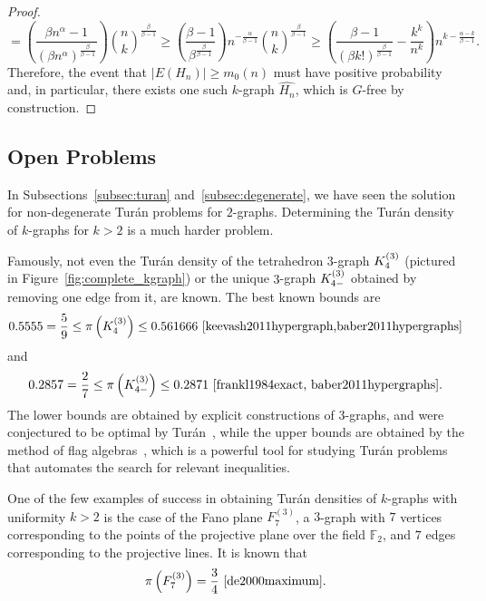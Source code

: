 \begin{proposition}
\begin{proof}
\[            = \left( \frac{\beta n^{\alpha} - 1}{\left( \beta n^{\alpha} \right)^\frac{\beta}{\beta-1}} \right) \binom{n}{k}^{\frac{\beta}{\beta-1}}
            \geq \left( \frac{\beta - 1}{\beta^{\frac{\beta}{\beta - 1}}} \right) n^{- \frac{\alpha}{\beta - 1}} \binom{n}{k}^{\frac{\beta}{\beta - 1}}
            \geq \left( \frac{\beta - 1}{(\beta k!)^{\frac{\beta}{\beta - 1}}}  - \frac{k^k}{n^k} \right) n^{k - \frac{\alpha - k}{\beta - 1}}.
        \]
        Therefore, the event that $|E(H_n)| \geq m_0(n)$
        must have positive probability and, in particular,
        there exists one such $k$-graph $\widehat{H_n}$, which is $G$-free by construction.
    \end{proof}
\end{proposition}

\subsection{Open Problems}\label{subsec:open-problems} %

In Subsections~\ref{subsec:turan} and~\ref{subsec:degenerate}, we have
seen the solution for non-degenerate Turán problems for $2$-graphs.
Determining the Turán density of $k$-graphs for $k > 2$ is a much harder problem.

Famously, not even the Turán density of the tetrahedron $3$-graph $K^{(3)}_{4}$
(pictured in Figure~\ref{fig:complete_kgraph}) or the unique $3$-graph $K^{(3)}_{4-}$
obtained by removing one edge from it, are known.
The best known bounds are
\[
    0.5555 = \frac{5}{9}
    \leq \pi\left(\completesuperindex{3}{4}\right)
    \leq 0.561666~\cite{keevash2011hypergraph,baber2011hypergraphs} %
\]
and
\[
     0.2857 = \frac{2}{7}
     \leq \pi\left(K^{(3)}_{4-}\right)
     \leq 0.2871~\cite{frankl1984exact, baber2011hypergraphs}.
\]
The lower bounds are obtained by explicit constructions of $3$-graphs,
and were conjectured to be optimal by Turán~\cite{keevash2011hypergraph},
while the upper bounds are obtained by the method of flag algebras~\cite{razborov2007flag},
which is a powerful tool for studying Turán problems that automates the search for relevant inequalities.

One of the few examples of success in obtaining Turán densities of $k$-graphs with uniformity $k > 2$ is the case of
the Fano plane $F^{(3)}_7$, a $3$-graph with $7$ vertices corresponding to the points
of the projective plane over the field $\mathbb{F}_2$,
and $7$ edges corresponding to the projective lines.
It is known that
\[
    \pi\left(F^{(3)}_7\right) = \frac{3}{4}~\cite{de2000maximum}.
\]

